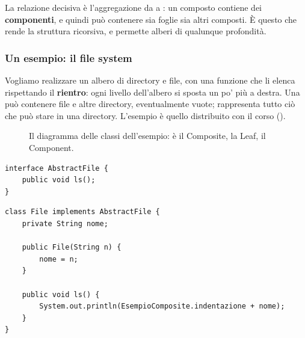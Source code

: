 \medskip
La relazione decisiva è l'aggregazione da  a : un composto contiene dei \textbf{componenti}, e
quindi può contenere sia foglie sia altri composti. È questo che rende la struttura ricorsiva, e permette alberi di
qualunque profondità.

\subsubsection*{Un esempio: il file system}

Vogliamo realizzare un albero di directory e file, con una funzione  che li elenca rispettando il
\textbf{rientro}: ogni livello dell'albero si sposta un po' più a destra. Una  può contenere file e altre
directory, eventualmente vuote;  rappresenta tutto ciò che può stare in una directory. L'esempio è quello
distribuito con il corso ().

\begin{figure}[H]
\centering
{}
\caption{Il diagramma delle classi dell'esempio:  è il Composite,  la Leaf,  il
Component.}
\end{figure}

\noindent\begin{minipage}[t]{0.36\textwidth}
\begin{lstlisting}[style=java, name=AbstractFile.java]
interface AbstractFile {
    public void ls();
}
\end{lstlisting}
\end{minipage}\hfill
\begin{minipage}[t]{0.61\textwidth}
\begin{lstlisting}[style=java, name=File.java]
class File implements AbstractFile {
    private String nome;

    public File(String n) {
        nome = n;
    }

    public void ls() {
        System.out.println(EsempioComposite.indentazione + nome);
    }
}
\end{lstlisting}
\end{minipage}

